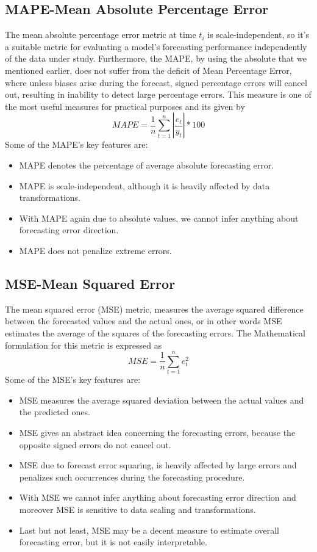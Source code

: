 \subsection{MAPE-Mean Absolute Percentage Error}
The mean absolute percentage error metric at time $t_{i}$ is scale-independent, so it's a suitable metric for evaluating a model's forecasting performance independently of the data under study. Furthermore, the MAPE, by using the absolute that we mentioned earlier, does not suffer from the deficit of Mean Percentage Error, where unless biases arise during the forecast, signed percentage errors will cancel out, resulting in inability to detect large percentage errors.
This measure is one of the most useful measures for practical purposes and its given by $$MAPE=\frac{1}{n}\sum_{t=1}^{n}{|\frac{e_{t}}{y_{t}}|*100}$$  
Some of the MAPE's key features are: 
\begin{itemize}
    \item MAPE denotes the percentage of average absolute forecasting error.
    \item MAPE is scale-independent, although it is heavily affected by data transformations. 
    \item With MAPE again due to absolute values, we cannot infer anything about forecasting error direction.  
    \item MAPE does not penalize extreme errors.
\end{itemize}
\subsection{MSE-Mean Squared Error}
The mean squared error (MSE) metric, measures the average squared difference between the forecasted values and the actual ones, or in other words MSE estimates the average of the squares of the forecasting errors.
The Mathematical formulation for this metric is expressed as $$MSE=\frac{1}{n}\sum_{t=1}^{n}{e_{t}^2}$$  Some of the MSE's key features are: \begin{itemize}
    \item MSE measures the average squared deviation between the actual values and the predicted ones.
    \item MSE gives an abstract idea concerning the forecasting errors, because the opposite signed errors do not cancel out.
    \item MSE due to forecast error squaring, is heavily affected by large errors and penalizes such occurrences during the forecasting procedure.
    \item With MSE we cannot infer anything about forecasting error direction and moreover MSE is sensitive to data scaling and transformations. 
    \item Last but not least, MSE may be a decent measure to estimate overall forecasting error, but it is not easily interpretable.
\end{itemize} 
